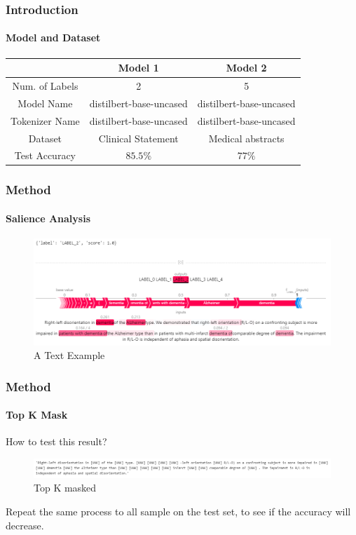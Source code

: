 \documentclass{beamer}
\begin{document}
\begin{frame}
    \frametitle{Introduction}
    \framesubtitle{Model and Dataset}

    \begin{tabular}{|c||c||c|}
        \hline
             & Model 1 & Model 2 \\ 
        \hline
            Num. of Labels & 2 & 5\\ 
        \hline
            Model Name & distilbert-base-uncased & distilbert-base-uncased\\ 
        \hline
        Tokenizer Name & distilbert-base-uncased & distilbert-base-uncased\\ 
        \hline
        Dataset & Clinical Statement  & Medical abstracts \\ 
        \hline
        Test Accuracy & $85.5\%$ & $77\%$\\ 
        \hline
        \end{tabular}

\end{frame}


\begin{frame}
    \frametitle{Method}
    \framesubtitle{Salience Analysis}

    \begin{figure}
        \centering
            \includegraphics[width=1\textwidth]{Saliency Example4.png}
            \caption{A Text Example}
            \label{fig:TextExample}
        \end{figure}


\end{frame}

\begin{frame}
    \frametitle{Method}
    \framesubtitle{Top K Mask}
How to test this result?
    \begin{figure}
        \centering
            \includegraphics[width=1\textwidth]{Top K Masked3.png}
            \caption{Top K masked}
            \label{fig:MaskedExample}
    \end{figure}

\par
Repeat the same process to all sample on the test set, to see if the accuracy will decrease.
\end{frame}
\end{document}
